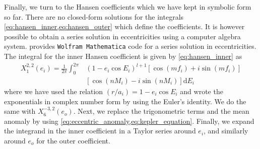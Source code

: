 \documentclass[ twoside,openright,titlepage,numbers=noenddot,headinclude,%
                footinclude=true,cleardoublepage=empty,abstractoff, %
                BCOR=5mm,paper=a4,fontsize=11pt,%
                american,%
                ]{scrreprt}
\begin{document}
Finally, we turn to the Hansen coefficients which we have kept in symbolic 
form so far. There are no closed-form solutions for the integrals 
\cref{eq:hansen_inner,eq:hansen_outer} which define the coefficients. 
It is however possible to obtain a series solution in eccentricities 
using a computer algebra system. 
\Cite{Mardling2013} provides \texttt{Wolfram Mathematica} \citep{Mathematica} code 
for a series solution in eccentricities. The integral
for the inner Hansen coefficient is given by \cref{eq:hansen_inner} as
\begin{equation}
    \begin{aligned}
        X^{2,2}_1(e_i)= \frac{1}{2\pi} \int^{2\pi}_0 &(1-e_i\cos E_i)^{l+1}
        \left[\cos(mf_i)+i\sin(mf_i)\right]\\
        &\left[\cos(nM_i)-i\sin(nM_i)\right]\mathrm{d}E_i
    \end{aligned}
\end{equation}
where we have used the relation $(r/a_i)=1-e_i\cos E_i$ and wrote the 
exponentials in complex number form by using the Euler's identity. We 
do the same with $X^{-3,2}_6(e_o)$. Next, we replace the trigonometric 
terms and the mean anomaly
by using \cref{eq:eccentric_anomaly,eq:kepler_equation}. Finally,
we expand the integrand in the inner coefficient in a Taylor series 
around $e_i$, and similarly around $e_o$ for the outer coefficient.
\end{document}
